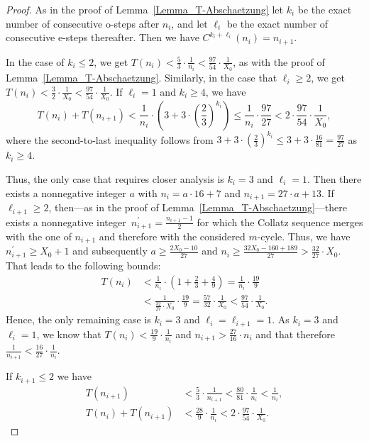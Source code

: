 \documentclass[12pt,reqno]{article}
\begin{document}
\begin{proof}
As in the proof of Lemma~\ref{Lemma_T-Abschaetzung} let $k_i$ be the exact number of consecutive o-steps after $n_i$, and let $\ell_i$ be the exact number of consecutive e-steps thereafter. Then we have $C^{k_i+\ell_i}(n_i)=n_{i+1}$.

In the case of $k_i\leq 2$, we get $T(n_i) < \tfrac{5}{3} \cdot \tfrac{1}{n_i} < \tfrac{97}{54} \cdot \tfrac{1}{X_0}$, as with the proof of Lemma~\ref{Lemma_T-Abschaetzung}. Similarly, in the case that $\ell_i\geq 2$, we get $T(n_i) < \tfrac{3}{2} \cdot \tfrac{1}{X_0}<\tfrac{97}{54} \cdot \tfrac{1}{X_0}$. If $\ell_i=1$ and $k_i\geq 4$, we have 
\[T(n_i)+T(n_{i+1}) < \frac{1}{n_i} \cdot \left(3 + 3 \cdot \left(\frac{2}{3}\right)^{k_i}  \right) \leq \frac{1}{n_i} \cdot \frac{97}{27} < 2 \cdot \frac{97}{54} \cdot \frac{1}{X_0},\]
where the second-to-last inequality follows from $3 + 3 \cdot \left(\tfrac{2}{3}\right)^{k_i}\leq 3+ 3\cdot \frac{16}{81}=\frac{97}{27}$ as $k_i\geq 4$.

Thus, the only case that requires closer analysis is $k_i=3$ and $\ell_i=1$. Then there exists a nonnegative integer $a$ with $n_i=a\cdot 16 + 7$ and $n_{i+1}=27 \cdot a + 13$. If $\ell_{i+1}\geq 2$, then---as in the proof of Lemma~\ref{Lemma_T-Abschaetzung}---there exists a nonnegative integer~$n_{i+1}^{\prime}=\tfrac{n_{i+1}-1}{2}$ for which the Collatz sequence merges with the one of $n_{i+1}$ and therefore with the considered $m$-cycle. Thus, we have $n_{i+1}^{\prime}\geq X_0+1$ and subsequently $a \geq \tfrac{2X_0-10}{27}$ and $n_i \geq \tfrac{32X_0-160+189}{27} > \tfrac{32}{27} \cdot X_0$. That leads to the following
bounds:
\begin{align*}
T(n_i) &< \frac{1}{n_i} \cdot \left(1+\frac{2}{3}+\frac{4}{9}\right) =\frac{1}{n_i} \cdot \frac{19}{9}\\
\quad &< \frac{1}{\tfrac{32}{27} \cdot X_0} \cdot \frac{19}{9}= \frac{57}{32} \cdot \frac{1}{X_0} < \frac{97}{54} \cdot \frac{1}{X_0}.
\end{align*}
Hence, the only remaining case is $k_i=3$ and $\ell_i=\ell_{i+1}=1$. As $k_i=3$ and $\ell_i=1$, we know that $T(n_i)<\tfrac{19}{9} \cdot \tfrac{1}{n_i}$ and  $n_{i+1}>\tfrac{27}{16} \cdot n_i$ and that therefore $\tfrac{1}{n_{i+1}} < \tfrac{16}{27} \cdot \tfrac{1}{n_i}$. 

If $k_{i+1}\leq 2$ we have 
\begin{align*}
T(n_{i+1})&<\frac{5}{3} \cdot \frac{1}{n_{i+1}} < \frac{80}{81} \cdot \frac{1}{n_i} < \frac{1}{n_i},\\ 
T(n_i)+T(n_{i+1})&< \frac{28}{9} \cdot \frac{1}{n_i} < 2 \cdot \frac{97}{54} \cdot \frac{1}{X_0}.
\end{align*}


\end{proof}
\end{document}
